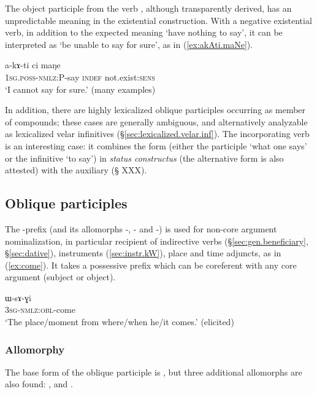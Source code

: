The object participle  from the verb , although transparently derived, has an unpredictable meaning in the existential construction. With a negative existential verb, in addition to the expected meaning `have nothing to say', it can be interpreted as `be unable to say for sure', as in (\ref{ex:akAti.maNe}).

  \begin{exe}
\ex \label{ex:akAti.maNe}
\gll    a-kɤ-ti ci maŋe \\
 \textsc{1sg}.\textsc{poss}-\textsc{nmlz}:P-say \textsc{indef} not.exist:\textsc{sens} \\
 \glt `I cannot say for sure.' (many examples)
  \end{exe}
  
 
In addition, there are highly lexicalized oblique participles occurring as member of compounds; these cases are generally ambiguous, and alternatively analyzable as  lexicalized velar infinitives (§\ref{sec:lexicalized.velar.inf}). The incorporating verb  is an interesting case: it combines the form  (either the participle `what one says' or the infinitive `to say') in \textit{status constructus}  (the alternative form  is also attested) with the auxiliary  (§ XXX).
 
\subsection{Oblique participles} \label{sec:oblique.participle}
The -prefix (and its allomorphs -, - and -) is used for non-core argument nominalization, in particular recipient of indirective verbs (§\ref{sec:gen.beneficiary}, §\ref{sec:dative}), instruments (\ref{sec:instr.kW}), place and time adjuncts, as in (\ref{ex:come}). It takes a possessive prefix which can be coreferent with any core argument (subject or object).

\begin{exe}
\ex \label{ex:come}
\gll ɯ-sɤ-ɣi \\
 \textsc{3sg-nmlz:obl}-come \\
\glt  `The place/moment from where/when he/it comes.' (elicited)
\end{exe}
 
 
 \subsubsection{Allomorphy} \label{sec:oblique.participle.allomorphy}
The base form of the oblique participle is , but three additional allomorphs are also found: ,  and .


